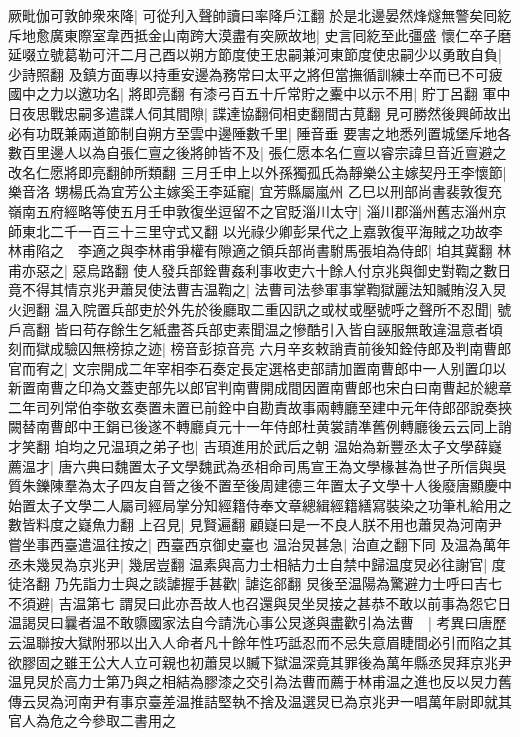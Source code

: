 厥毗伽可敦帥衆來降|{
	可從刋入聲帥讀曰率降戶江翻}
於是北邊晏然烽燧無警矣囘紇斥地愈廣東際室韋西抵金山南跨大漠盡有突厥故地|{
	史言囘紇至此彊盛}
懷仁卒子磨延啜立號葛勒可汗二月己酉以朔方節度使王忠嗣兼河東節度使忠嗣少以勇敢自負|{
	少詩照翻}
及鎮方面專以持重安邊為務常曰太平之將但當撫循訓練士卒而已不可疲國中之力以邀功名|{
	將即亮翻}
有漆弓百五十斤常貯之櫜中以示不用|{
	貯丁呂翻}
軍中日夜思戰忠嗣多遣諜人伺其間隙|{
	諜達協翻伺相吏翻間古莧翻}
見可勝然後興師故出必有功既兼兩道節制自朔方至雲中邊陲數千里|{
	陲音垂}
要害之地悉列置城堡斥地各數百里邊人以為自張仁亶之後將帥皆不及|{
	張仁愿本名仁亶以睿宗諱旦音近亶避之改名仁愿將即亮翻帥所類翻}
三月壬申上以外孫獨孤氏為靜樂公主嫁契丹王李懷節|{
	樂音洛}
甥楊氏為宜芳公主嫁奚王李延寵|{
	宜芳縣屬嵐州}
乙巳以刑部尚書裴敦復充嶺南五府經略等使五月壬申敦復坐逗留不之官貶淄川太守|{
	淄川郡淄州舊志淄州京師東北二千一百三十三里守式又翻}
以光祿少卿彭杲代之上嘉敦復平海賊之功故李林甫陷之　李適之與李林甫爭權有隙適之領兵部尚書駙馬張垍為侍郎|{
	垍其冀翻}
林甫亦惡之|{
	惡烏路翻}
使人發兵部銓曹姦利事收吏六十餘人付京兆與御史對鞫之數日竟不得其情京兆尹蕭炅使法曹吉温鞫之|{
	法曹司法參軍事掌鞫獄麗法知贓賄沒入炅火迥翻}
温入院置兵部吏於外先於後廳取二重囚訊之或杖或壓號呼之聲所不忍聞|{
	號戶高翻}
皆曰苟存餘生乞紙盡荅兵部吏素聞温之慘酷引入皆自誣服無敢違温意者頃刻而獄成驗囚無榜掠之迹|{
	榜音彭掠音亮}
六月辛亥敕誚責前後知銓侍郎及判南曹郎官而宥之|{
	文宗開成二年宰相李石奏定長定選格吏部請加置南曹郎中一人别置卬以新置南曹之印為文蓋吏部先以郎官判南曹開成間因置南曹郎也宋白曰南曹起於總章二年司列常伯李敬玄奏置未置已前銓中自勘責故事兩轉廳至建中元年侍郎邵說奏挾闕替南曹郎中王鋗已後遂不轉廳貞元十一年侍郎杜黄裳請凖舊例轉廳後云云同上誚才笑翻}
垍均之兄温頊之弟子也|{
	吉頊進用於武后之朝}
温始為新豐丞太子文學薛嶷薦温才|{
	唐六典曰魏置太子文學魏武為丞相命司馬宣王為文學椽甚為世子所信與吳質朱鑠陳羣為太子四友自晉之後不置至後周建德三年置太子文學十人後廢唐顯慶中始置太子文學二人屬司經局掌分知經籍侍奉文章總緝經籍繕寫裝染之功筆札給用之數皆料度之嶷魚力翻}
上召見|{
	見賢遍翻}
顧嶷曰是一不良人朕不用也蕭炅為河南尹嘗坐事西臺遣温往按之|{
	西臺西京御史臺也}
温治炅甚急|{
	治直之翻下同}
及温為萬年丞未幾炅為京兆尹|{
	幾居豈翻}
温素與高力士相結力士自禁中歸温度炅必往謝官|{
	度徒洛翻}
乃先詣力士與之談謔握手甚歡|{
	謔迄郤翻}
炅後至温陽為驚避力士呼曰吉七不須避|{
	吉温第七}
謂炅曰此亦吾故人也召還與炅坐炅接之甚恭不敢以前事為怨它日温謁炅曰曩者温不敢隳國家法自今請洗心事公炅遂與盡歡引為法曹　|{
	考異曰唐歷云温聯按大獄附邪以出入人命者凡十餘年性巧詆忍而不忌失意眉睫間必引而陷之其欲膠固之雖王公大人立可親也初蕭炅以贓下獄温深竟其罪後為萬年縣丞炅拜京兆尹温見炅於高力士第乃與之相結為膠漆之交引為法曹而薦于林甫温之進也反以炅力舊傳云炅為河南尹有事京臺差温推詰堅執不捨及温選炅已為京兆尹一唱萬年尉即就其官人為危之今參取二書用之}
